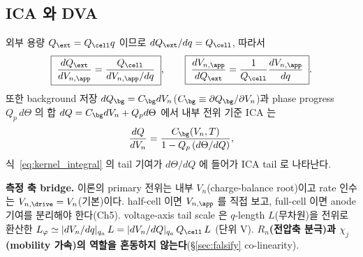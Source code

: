 \subsection{ICA 와 DVA}
외부 용량 $Q_\ext=Q_\cell q$ 이므로 $dQ_\ext/dq=Q_\cell$, 따라서
\begin{equation}
\boxed{\;\frac{dQ_\ext}{dV_{n,\app}}=\frac{Q_\cell}{dV_{n,\app}/dq}\;},\qquad
\boxed{\;\frac{dV_{n,\app}}{dQ_\ext}=\frac{1}{Q_\cell}\frac{dV_{n,\app}}{dq}\;}.
\label{eq:icadva}
\end{equation}
또한 background 저장 $dQ_\bg=C_\bg dV_n$($C_\bg\equiv\partial Q_\bg/\partial V_n$)과 phase progress
$Q_p\,d\Theta$ 의 합 $dQ=C_\bg dV_n+Q_p d\Theta$ 에서 내부 전위 기준 ICA 는
\begin{equation}
\frac{dQ}{dV_n}=\frac{C_\bg(V_n,T)}{1-Q_p\,(d\Theta/dQ)},
\label{eq:ica_internal}
\end{equation}
식~\eqref{eq:kernel_integral} 의 tail 기여가 $d\Theta/dQ$ 에 들어가 ICA tail 로 나타난다.

\textbf{측정 축 bridge.} 이론의 primary 전위는 내부 $V_n$(charge-balance root)이고 rate 인수는
$V_{n,\drive}=V_n$(기본)이다. half-cell 이면 $V_{n,\app}$ 를 직접 보고, full-cell 이면 anode 기여를 분리해야
한다(Ch5). voltage-axis tail scale 은 $q$-length $L$(무차원)을 전위로 환산한
$L_\varphi\simeq|dV_n/dq|_{q_a}\,L=|dV_n/dQ|_{q_a}\,Q_\cell\,L$ (단위 V). \textbf{$R_n$(전압축 분극)과
$\chi_j$(mobility 가속)의 역할을 혼동하지 않는다}(\S\ref{sec:falsify} co-linearity).

